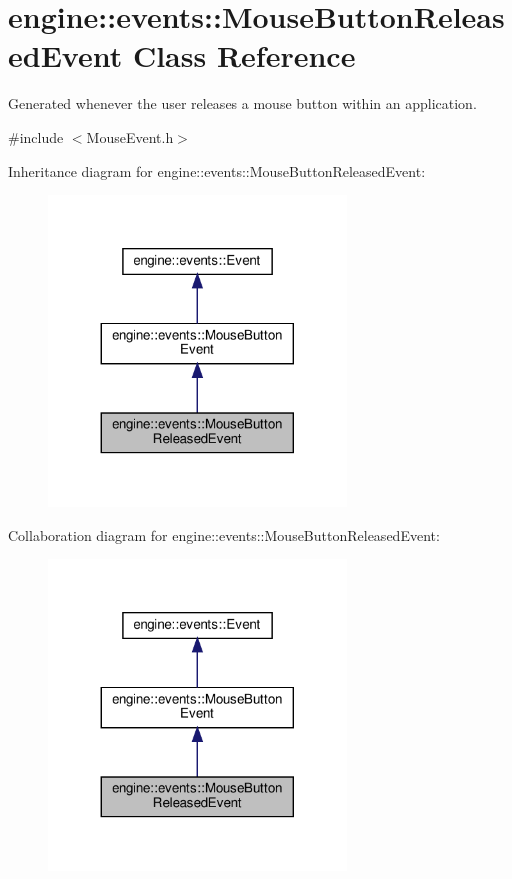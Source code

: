 \hypertarget{classengine_1_1events_1_1MouseButtonReleasedEvent}{}\section{engine\+:\+:events\+:\+:Mouse\+Button\+Released\+Event Class Reference}
\label{classengine_1_1events_1_1MouseButtonReleasedEvent}


Generated whenever the user releases a mouse button within an application.  




{\ttfamily \#include $<$Mouse\+Event.\+h$>$}



Inheritance diagram for engine\+:\+:events\+:\+:Mouse\+Button\+Released\+Event\+:\nopagebreak
\begin{figure}[H]
\begin{center}
\leavevmode
\includegraphics[width=224pt]{classengine_1_1events_1_1MouseButtonReleasedEvent__inherit__graph}
\end{center}
\end{figure}


Collaboration diagram for engine\+:\+:events\+:\+:Mouse\+Button\+Released\+Event\+:\nopagebreak
\begin{figure}[H]
\begin{center}
\leavevmode
\includegraphics[width=224pt]{classengine_1_1events_1_1MouseButtonReleasedEvent__coll__graph}
\end{center}
\end{figure}
